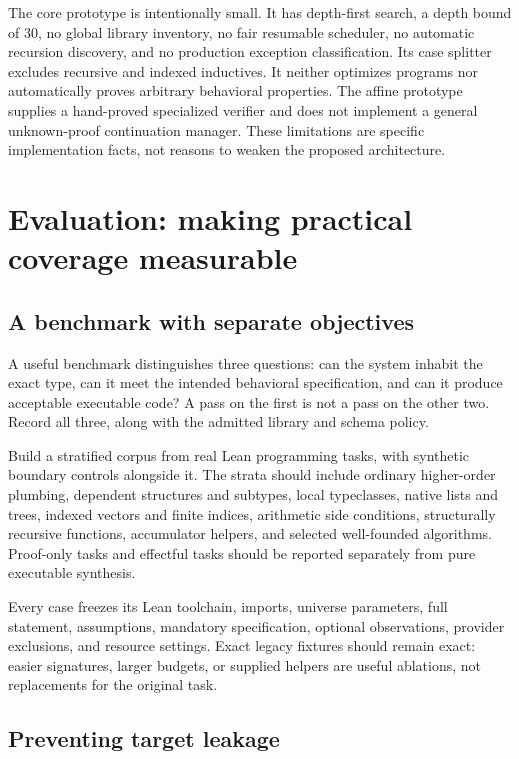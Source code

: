 The core prototype is intentionally small. It has depth-first search, a depth bound of 30, no global library inventory, no fair resumable scheduler, no automatic recursion discovery, and no production exception classification. Its case splitter excludes recursive and indexed inductives. It neither optimizes programs nor automatically proves arbitrary behavioral properties. The affine prototype supplies a hand-proved specialized verifier and does not implement a general unknown-proof continuation manager. These limitations are specific implementation facts, not reasons to weaken the proposed architecture.

\section{Evaluation: making practical coverage measurable}
\label{sec:evaluation}

\subsection{A benchmark with separate objectives}

A useful benchmark distinguishes three questions: can the system inhabit the exact type, can it meet the intended behavioral specification, and can it produce acceptable executable code? A pass on the first is not a pass on the other two. Record all three, along with the admitted library and schema policy.

Build a stratified corpus from real Lean programming tasks, with synthetic boundary controls alongside it. The strata should include ordinary higher-order plumbing, dependent structures and subtypes, local typeclasses, native lists and trees, indexed vectors and finite indices, arithmetic side conditions, structurally recursive functions, accumulator helpers, and selected well-founded algorithms. Proof-only tasks and effectful tasks should be reported separately from pure executable synthesis.

Every case freezes its Lean toolchain, imports, universe parameters, full statement, assumptions, mandatory specification, optional observations, provider exclusions, and resource settings. Exact legacy fixtures should remain exact: easier signatures, larger budgets, or supplied helpers are useful ablations, not replacements for the original task.

\subsection{Preventing target leakage}

